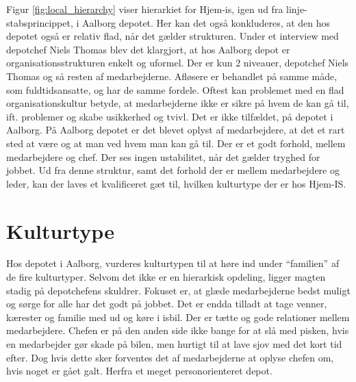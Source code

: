 Figur \ref{fig:local_hierarchy} viser hierarkiet for Hjem-is, igen ud fra linje-stabsprincippet\cite{Organisation}, i Aalborg depotet. Her kan det også konkluderes, at den hos depotet også er relativ flad, når det gælder strukturen. Under et interview med depotchef Niels Thomas blev det klargjort, at hos Aalborg depot er organisationsstrukturen enkelt og uformel. Der er kun 2 niveauer, depotchef Niels Thomas og så resten af medarbejderne. Afløsere er behandlet på samme måde, som fuldtidsansatte, og har de samme fordele. Oftest kan problemet med en flad organisationskultur betyde, at medarbejderne ikke er sikre på hvem de kan gå til, ift. problemer og skabe usikkerhed og tvivl. Det er ikke tilfældet, på depotet i Aalborg. På Aalborg depotet er det blevet oplyst af medarbejdere, at det et rart sted at være og at man ved hvem man kan gå til. Der er et godt forhold, mellem medarbejdere og chef. Der ses ingen ustabilitet, når det gælder tryghed for jobbet. Ud fra denne struktur, samt det forhold der er mellem medarbejdere og leder, kan der laves et kvalificeret gæt til, hvilken kulturtype der er hos Hjem-IS.

\section{Kulturtype}
Hos depotet i Aalborg, vurderes kulturtypen til at høre ind under “familien” af de fire kulturtyper\cite{Organisation}. Selvom det ikke er en hierarkisk opdeling, ligger magten stadig på depotchefens skuldrer. Fokuset er, at glæde medarbejderne bedst muligt og sørge for alle har det godt på jobbet. Det er endda tilladt at tage venner, kærester og familie med ud og køre i isbil. Der er tætte og gode relationer mellem medarbejdere. Chefen er på den anden side ikke bange for at slå med pisken, hvis en medarbejder gør skade på bilen, men hurtigt til at lave sjov med det kort tid efter. Dog hvis dette sker forventes det af medarbejderne at oplyse chefen om, hvis noget er gået galt. Herfra et meget personorienteret depot.

